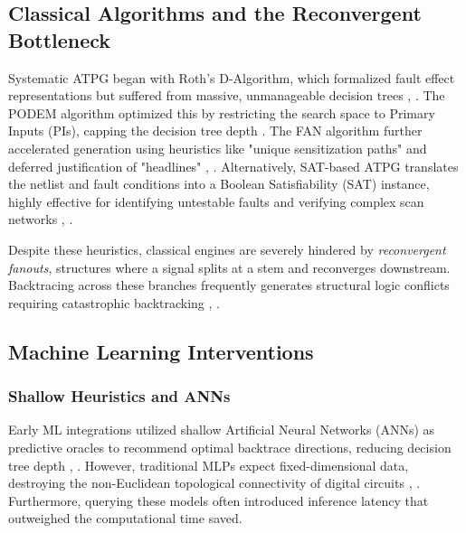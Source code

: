 \documentclass[conference]{IEEEtran}
\begin{document}
\subsection{Classical Algorithms and the Reconvergent Bottleneck}
Systematic ATPG began with Roth's D-Algorithm, which formalized fault effect representations but suffered from massive, unmanageable decision trees \cite{inf-atpg-rl}, \cite{fujiwara1983acceleration}. The PODEM algorithm optimized this by restricting the search space to Primary Inputs (PIs), capping the decision tree depth \cite{inf-atpg-rl}. The FAN algorithm further accelerated generation using heuristics like "unique sensitization paths" and deferred justification of "headlines" \cite{inf-atpg-rl}, \cite{fujiwara1983acceleration}. Alternatively, SAT-based ATPG translates the netlist and fault conditions into a Boolean Satisfiability (SAT) instance, highly effective for identifying untestable faults and verifying complex scan networks \cite{scan-networks-baranowski}, \cite{scan-networks-reconfig}.

Despite these heuristics, classical engines are severely hindered by \textit{reconvergent fanouts}, structures where a signal splits at a stem and reconverges downstream. Backtracing across these branches frequently generates structural logic conflicts requiring catastrophic backtracking \cite{fujiwara1983acceleration}, \cite{huang2021machine}.

\subsection{Machine Learning Interventions}

\subsubsection{Shallow Heuristics and ANNs}
Early ML integrations utilized shallow Artificial Neural Networks (ANNs) as predictive oracles to recommend optimal backtrace directions, reducing decision tree depth \cite{roy2020machine}, \cite{rl-atpg-ieee-ats}. However, traditional MLPs expect fixed-dimensional data, destroying the non-Euclidean topological connectivity of digital circuits \cite{deepgate2-arxiv}, \cite{huang2021machine}. Furthermore, querying these models often introduced inference latency that outweighed the computational time saved.
\end{document}
